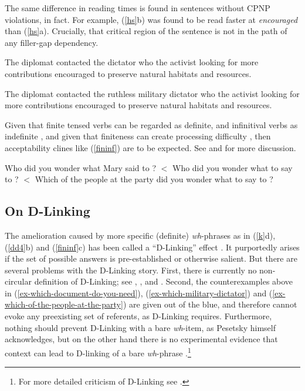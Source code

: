 \documentclass[output=paper,biblatex,babelshorthands,newtxmath,draftmode,colorlinks,citecolor=brown]{langscibook}
\begin{document}
\eal
\label{dd4}
\zl



\noindent
The same difference in reading times is found in sentences without CPNP violations, in fact. For
example, (\ref{hs}b) was found to be read faster at \emph{encouraged} than (\ref{hs}a). Crucially,
that critical region of the sentence is not in the path of any filler-gap dependency.
 
\ealnoraggedright \label{hs}
\ex The diplomat contacted the dictator who the activist looking for more contributions encouraged to preserve natural habitats and resources.
 
\ex The diplomat contacted the ruthless military dictator who the activist looking for more contributions encouraged to preserve natural habitats and resources.
\zl


Given that finite tensed verbs can be regarded as definite, and infinitival verbs as indefinite
\citep{partee84}, and given that finiteness can create processing difficulty
\citep{kluender92,gibson0000}, then acceptability clines like (\ref{fininf}) are to be expected. See
\citet[Chapter 5]{levhubook} and \citet[308]{levine17} for more discussion.

\eal \label{fininf}
\ex Who did you wonder what Mary said to \spc?  $<$
\ex Who did you wonder what to say to \spc?  $<$
\ex\label{ex-which-of-the-people-at-the-party} 
Which of the people at the party did you wonder what to say to \spc? 
\zl

\subsection{On D-Linking}

The amelioration caused by more specific (definite) \emph{wh}-phrases as in (\ref{k}d), (\ref{dd4}b)
and (\ref{fininf}c) has been called a ``D-Linking'' effect \citep{pesetskydlink,pesetskybook}. It
purportedly arises if the set of possible answers is pre-established or otherwise salient. But there
are several problems with the D-Linking story.  First, there is currently no non-circular definition
of D-Linking; see \citet[16]{pesetskybook}, \citet[247--250]{ginzsag}, \citet[33, 39]{chung94} and
\citet[242, 268--271]{levhubook}. Second, the counterexamples above in (\ref{ex-which-document-do-you-need}), (\ref{ex-which-military-dictator}) and (\ref{ex-which-of-the-people-at-the-party}) are given out of the blue, and
therefore cannot evoke any preexisting set of referents, as D-Linking requires.  Furthermore,
nothing should prevent D-Linking with a bare \emph{wh}-item, as Pesetsky himself acknowledges, but
on the other hand there is no experimental evidence that context can lead to D-linking of a bare
\emph{wh}-phrase \citep{sprousediss07,villata}.\footnote{For more detailed criticism of D-Linking
  see \citet{hof2007}.}
\end{document}
